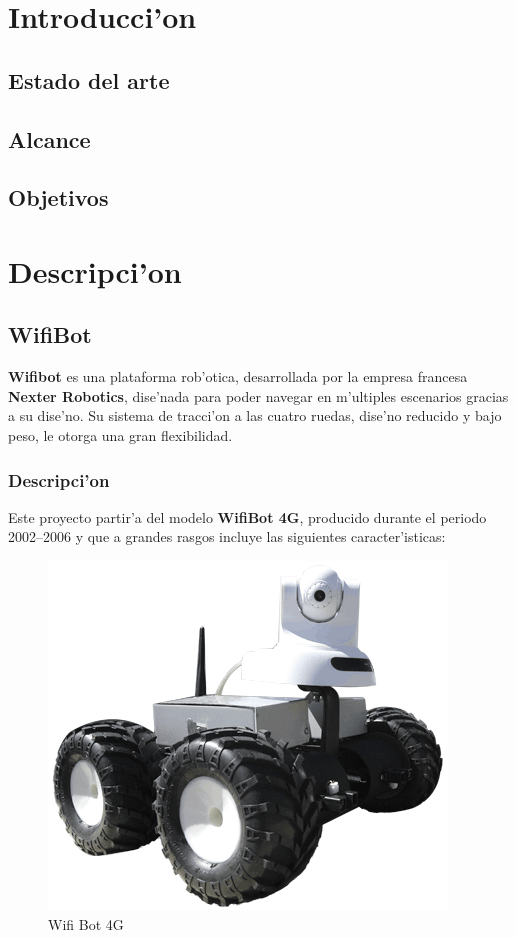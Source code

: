 \documentclass[twoside,12pt]{article}
\begin{document}


\newpage

\section{Introducci'on}

\subsection{Estado del arte}

\subsection{Alcance}


\subsection{Objetivos}

\newpage

\section{Descripci'on }

\subsection{WifiBot}
\textbf{Wifibot} es una plataforma rob'otica, desarrollada por la empresa francesa \textbf{Nexter Robotics}, dise'nada para poder navegar en m'ultiples escenarios gracias a su dise'no. Su sistema de tracci'on a las cuatro ruedas, dise'no reducido y bajo peso, le otorga una gran flexibilidad.

\subsubsection{Descripci'on}
Este proyecto partir'a del modelo \textbf{WifiBot 4G}, producido durante el periodo 2002--2006 y que a grandes rasgos incluye las siguientes caracter'isticas:

\begin{figure}[ht]
\centering
\includegraphics[scale=0.5]{images/Visuel_Wifibot_2.png} 
\caption{Wifi Bot 4G}
\label{fig:Wifi Bot 4G}
\end{figure}
\end{document}

